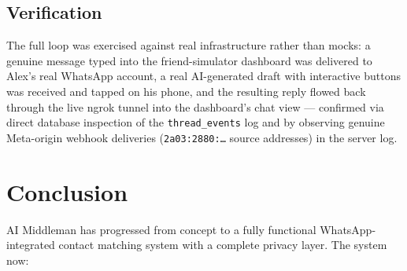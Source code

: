 \documentclass[12pt, a4paper]{report}
\begin{document}
\section{Verification}

The full loop was exercised against real infrastructure rather than mocks: a genuine message typed into the friend-simulator dashboard was delivered to Alex's real WhatsApp account, a real AI-generated draft with interactive buttons was received and tapped on his phone, and the resulting reply flowed back through the live ngrok tunnel into the dashboard's chat view --- confirmed via direct database inspection of the \texttt{thread\_events} log and by observing genuine Meta-origin webhook deliveries (\texttt{2a03:2880:\ldots} source addresses) in the server log.

\chapter{Conclusion}

AI Middleman has progressed from concept to a fully functional WhatsApp-integrated contact matching system with a complete privacy layer. The system now:
\end{document}
